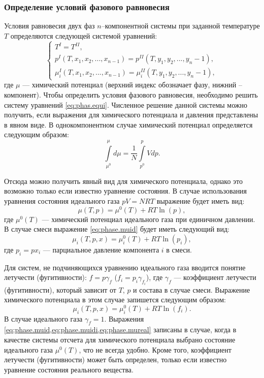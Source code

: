 \subsubsection{Определение условий фазового равновесия}
Условия равновесия двух фаз $n$--компонентной системы при заданной температуре $T$ определяются следующей системой уравнений:
\begin{equation}\label{eq:phas.equi}
\left\lbrace 
\begin{gathered} 
T^{I}=T^{II},\\
p^{I}(T,x_1,x_2,...,x_{n-1})=p^{II}(T,y_1,y_2,...,y_n-1),\\
\mu_i^{I}(T,x_1,x_2,...,x_{n-1})=\mu^{II}_i(T,y_1,y_2,...,y_n-1),
\end{gathered} 
\right.
\end{equation}
где $\mu$ --- химический потенциал (верхний индекс обозначает фазу, нижний – компонент). Чтобы определить условия фазового равновесия, необходимо решить систему уравнений \eqref{eq:phas.equi}. Численное решение данной системы можно получить, если выражения для химического потенциала и давления представлены в явном виде.
В однокомпонентном случае химический потенциал определяется следующим образом:
\begin{equation}
\int\limits_{\mu^0}^{\mu} d \mu=\dfrac{1}{N} \int\limits_{p^0}^{p} Vdp.
\end{equation}

Отсюда можно получить явный вид для химического потенциала, однако это возможно только если известно уравнение состояния. В случае использования уравнения состояния идеального газа $pV=NRT$ выражение будет иметь вид:
\begin{equation} \label{eq:phase.muid}
	\mu(T,p)=\mu^0(T)+RT \ln (p),
\end{equation}
где $\mu^0(T)$ --- химический потенциал идеального газа при единичном давлении. В случае смеси выражение \eqref{eq:phase.muid} будет иметь следующий вид:
\begin{equation} \label{eq:phase.muidi}
	\mu_i (T,p,x) = \mu_i^0(T) + RT \ln(p_i),
\end{equation}
где $p_i=p x_i$ --- парциальное давление компонента $i$ в смеси.

Для систем, не подчиняющихся уравнению идеального газа вводится понятие летучести (фугитивности): $f=p \gamma_f$ ($f_i=p_i \gamma_{f_i}$), где $\gamma_f$ --- коэффициент летучести (фугитивности), который зависит от $T$, $p$ и состава в случае смеси. Выражение химического потенциала в этом случае запишется следующим образом:
\begin{equation} \label{eq:phase.mureal}
	\mu_i (T,p,x) = \mu_i^0(T) + RT \ln(f_i).
\end{equation}
В случае идеального газа $\gamma_f=1$.
Выражения \cref{eq:phase.muid,eq:phase.muidi,eq:phase.mureal} записаны в случае, когда в качестве системы отсчета для химического потенциала выбрано состояние идеального газа $\mu^0(T)$, что не всегда удобно. Кроме того, коэффициент летучести (фугитивности) может быть определен, только если известно уравнение состояния реального вещества. 

